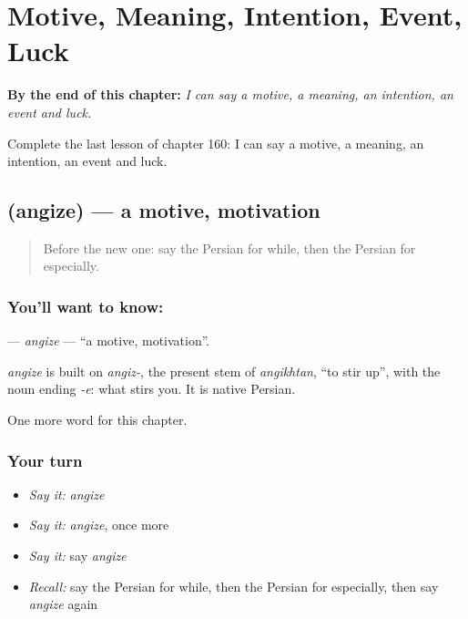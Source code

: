 
\chapter{Motive, Meaning, Intention, Event, Luck}
\label{ch:fa-motive-meaning-intention-event-luck}

\begin{chapteropening}
\textbf{By the end of this chapter:} \emph{I can say a motive, a meaning, an intention, an event and luck.}

Complete the last lesson of chapter 160: I can say a motive, a meaning, an intention, an event and luck.
\end{chapteropening}

\section[\texorpdfstring{\fa{انگیزه} (angize)}{انگیزه (angize)}]{ (angize) — a motive, motivation}

\label{lesson:FA-C160-angize}



\begin{quote}
Before the new one: say the Persian for while, then the Persian for especially.
\end{quote}

\subsection*{You'll want to know: }
\textbf{} — \emph{angize} — \textquotedblleft{}a motive, motivation\textquotedblright{}.

\begin{cousinweb}
\emph{angize} is built on \emph{angiz-}, the present stem of \emph{angikhtan}, \textquotedblleft{}to stir up\textquotedblright{}, with the noun ending \emph{-e}: what stirs you. It is native Persian.
\end{cousinweb}

\begin{grammarlens}[title={What you've built}]
One more word for this chapter.
\end{grammarlens}

\subsection*{Your turn}
\begin{itemize}
\raggedright
  \item \emph{Say it:} \emph{angize}
  \item \emph{Say it:} \emph{angize}, once more
  \item \emph{Say it:} say \emph{angize}
  \item \emph{Recall:} say the Persian for while, then the Persian for especially, then say \emph{angize} again
\end{itemize}

